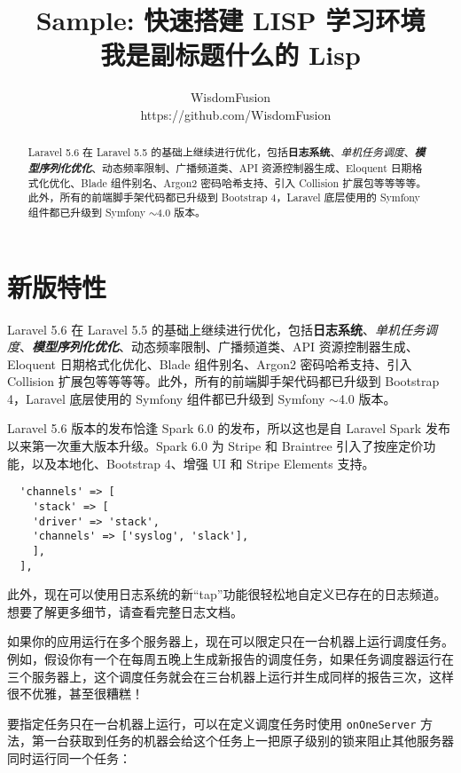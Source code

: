 \documentclass{progartcn}
\title{\bfseries\sffamily
  Sample: 快速搭建 LISP 学习环境\\
  \normalfont\zihao{-3}
  我是副标题什么的 Lisp
}
\author{WisdomFusion \\ \faGithubAlt~ https://github.com/WisdomFusion}
\date{}
\begin{document}
\maketitle
\thispagestyle{empty}


\begin{abstract}
\noindent Laravel 5.6 在 Laravel 5.5 的基础上继续进行优化，包括\textbf{日志系统}、\textit{单机任务调度}、\textbf{\textit{模型序列化优化}}、动态频率限制、广播频道类、API 资源控制器生成、Eloquent 日期格式化优化、Blade 组件别名、Argon2 密码哈希支持、引入 Collision 扩展包等等等等。此外，所有的前端脚手架代码都已升级到 Bootstrap 4，Laravel 底层使用的 Symfony 组件都已升级到 Symfony $\sim$4.0 版本。
\end{abstract}

\section{新版特性}
\label{newfeatures}

Laravel 5.6 在 Laravel 5.5 的基础上继续进行优化，包括\textbf{日志系统}、\textit{单机任务调度}、\textbf{\textit{模型序列化优化}}、动态频率限制、广播频道类、API 资源控制器生成、Eloquent 日期格式化优化、Blade 组件别名、Argon2 密码哈希支持、引入 Collision 扩展包等等等等。此外，所有的前端脚手架代码都已升级到 Bootstrap 4，Laravel 底层使用的 Symfony 组件都已升级到 Symfony $\sim$4.0 版本。

Laravel 5.6 版本的发布恰逢 Spark 6.0 的发布，所以这也是自 Laravel Spark 发布以来第一次重大版本升级。Spark 6.0 为 Stripe 和 Braintree 引入了按座定价功能，以及本地化、Bootstrap 4、增强 UI 和 Stripe Elements 支持。


\begin{lstlisting}
  'channels' => [
    'stack' => [
    'driver' => 'stack',
    'channels' => ['syslog', 'slack'],
    ],
  ],
\end{lstlisting}

此外，现在可以使用日志系统的新``tap''功能很轻松地自定义已存在的日志频道。想要了解更多细节，请查看完整日志文档。

如果你的应用运行在多个服务器上，现在可以限定只在一台机器上运行调度任务。例如，假设你有一个在每周五晚上生成新报告的调度任务，如果任务调度器运行在三个服务器上，这个调度任务就会在三台机器上运行并生成同样的报告三次，这样很不优雅，甚至很糟糕！

要指定任务只在一台机器上运行，可以在定义调度任务时使用 \verb|onOneServer| 方法，第一台获取到任务的机器会给这个任务上一把原子级别的锁来阻止其他服务器同时运行同一个任务：
\end{document}
